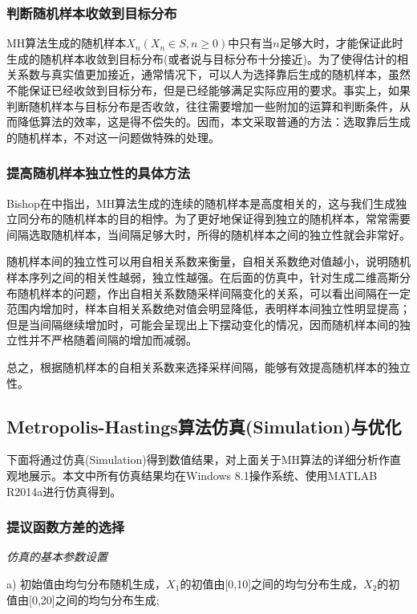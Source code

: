 \documentclass[11pt]{article}
\begin{document}
\subsubsection{判断随机样本收敛到目标分布}

MH算法生成的随机样本$X_{n}(X_{n}\in S,n\geq 0)$中只有当$n$足够大时，才能保证此时生成的随机样本收敛到目标分布(或者说与目标分布十分接近)。为了使得估计的相关系数与真实值更加接近，通常情况下，可以人为选择靠后生成的随机样本，虽然不能保证已经收敛到目标分布，但是已经能够满足实际应用的要求。事实上，如果判断随机样本与目标分布是否收敛，往往需要增加一些附加的运算和判断条件，从而降低算法的效率，这是得不偿失的。因而，本文采取普通的方法：选取靠后生成的随机样本，不对这一问题做特殊的处理。

\subsubsection{提高随机样本独立性的具体方法}
Bishop在\cite{PRML}中指出，MH算法生成的连续的随机样本是高度相关的，这与我们生成独立同分布的随机样本的目的相悖。为了更好地保证得到独立的随机样本，常常需要间隔选取随机样本，当间隔足够大时，所得的随机样本之间的独立性就会非常好。

随机样本间的独立性可以用自相关系数来衡量\cite{MH_A}，自相关系数绝对值越小，说明随机样本序列之间的相关性越弱，独立性越强。在后面的仿真中，针对生成二维高斯分布随机样本的问题，作出自相关系数随采样间隔变化的关系，可以看出间隔在一定范围内增加时，样本自相关系数绝对值会明显降低，表明样本间独立性明显提高；但是当间隔继续增加时，可能会呈现出上下摆动变化的情况，因而随机样本间的独立性并不严格随着间隔的增加而减弱。

总之，根据随机样本的自相关系数来选择采样间隔，能够有效提高随机样本的独立性。

\subsection{Metropolis-Hastings算法仿真(Simulation)与优化}
下面将通过仿真(Simulation)得到数值结果，对上面关于MH算法的详细分析作直观地展示。本文中所有仿真结果均在Windows 8.1操作系统、使用MATLAB R2014a进行仿真得到。

\subsubsection{提议函数方差的选择}

\noindent\emph{仿真的基本参数设置}

a) 初始值由均匀分布随机生成，$X_{1}$的初值由[0,10]之间的均匀分布生成，$X_{2}$的初值由[0,20]之间的均匀分布生成;
\end{document}
